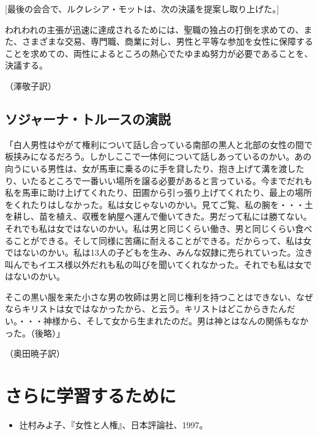\documentclass[dvipdfmx,uplatex]{jsarticle}
\begin{document}
  [最後の会合で、ルクレシア・モットは、次の決議を提案し取り上げた。]

われわれの主張が迅速に達成されるためには、聖職の独占の打倒を求めての、また、さまざまな交易、専門職、商業に対し、男性と平等な参加を女性に保障することを求めての、両性によるところの熱心でたゆまぬ努力が必要であることを、決議する。
\begin{flushright}
  （澤敬子訳）
\end{flushright}





\subsection{ソジャーナ・トルースの演説}
\label{truth}
「白人男性はやがて権利について話し合っている南部の黒人と北部の女性の間で板挟みになるだろう。しかしここで一体何について話しあっているのかい。あの向うにいる男性は、女が馬車に乗るのに手を貸したり、抱き上げて溝を渡したり、いたるところで一番いい場所を譲る必要があると言っている。今までだれも私を馬車に助け上げてくれたり、田圃から引っ張り上げてくれたり、最上の場所をくれたりはしなかった。私は女じゃないのかい。見てご覧、私の腕を・・・土を耕し、苗を植え、収穫を納屋へ運んで働いてきた。男だって私には勝てない。それでも私は女ではないのかい。私は男と同じくらい働き、男と同じくらい食べることができる。そして同様に苦痛に耐えることができる。だからって、私は女ではないのかい。私は13人の子どもを生み、みんな奴隷に売られていった。泣き叫んでもイエス様以外だれも私の叫びを聞いてくれなかった。それでも私は女ではないのかい。

そこの黒い服を来た小さな男の牧師は男と同じ権利を持つことはできない、なぜならキリストは女ではなかったから、と云う。キリストはどこからきたんだい。・・・神様から、そして女から生まれたのだ。男は神とはなんの関係もなかった。（後略）」

\begin{flushright}
  （奥田暁子訳）
\end{flushright}


\section{さらに学習するために}

\begin{itemize}
\item 辻村みよ子、『女性と人権』、日本評論社、1997。
\end{itemize}


\fi
\ifx\mybook\undefined
  

\end{document}
